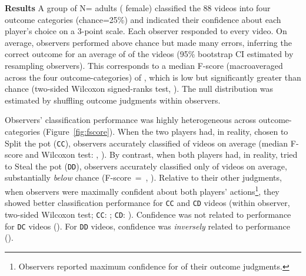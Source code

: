 \documentclass[10pt,letterpaper]{article}
\newcommand{\CC}{\texttt{CC}\xspace}
\newcommand{\CD}{\texttt{CD}\xspace}
\newcommand{\DC}{\texttt{DC}\xspace}
\newcommand{\DD}{\texttt{DD}\xspace}
\begin{document}
\vspace{1 mm}
\noindent\textbf{Results}
A group of N= adults ( female) classified the 88 videos into four outcome categories (chance=25\%) and indicated their confidence about each player's choice on a 3-point scale. Each observer responded to every video.
On average, observers performed above chance but made many errors, inferring the correct outcome for an average of
 of the videos (95\% bootstrap CI estimated by resampling observers). This corresponds to a
median F-score (macroaveraged across the four outcome-categories) of , which is low but significantly greater than chance (two-sided Wilcoxon signed-ranks test, ). 
The null distribution was estimated by shuffling outcome judgments within observers.

Observers' classification performance was highly heterogeneous across outcome-categories (Figure~\ref{fig:fscore}). When the two players had, in reality, chosen to Split the pot (\CC), observers accurately classified  of videos on average (median F-score and Wilcoxon test: , ).
 By contrast, when both players had, in reality, tried to Steal the pot (\DD), observers accurately classified only 
  of videos on average, substantially \emph{below} chance (F-score~=~, ). 
Relative to their other judgments, when observers were maximally confident about both players' actions\footnote{
Observers reported maximum confidence for  of their outcome judgments.
}, they showed better classification performance for \CC and \CD videos (within observer, two-sided Wilcoxon test; \CC: ; \CD: ). Confidence was not related to performance for \DC videos (). For \DD videos, confidence was \textit{inversely} related to performance ().
\end{document}
